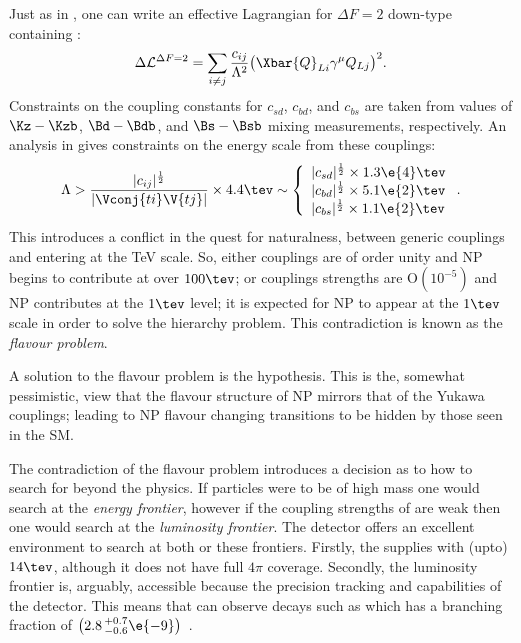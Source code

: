 Just as in , one can write an effective Lagrangian for $\Delta F=2$ down-type
\fcncs containing \np:
\begin{equation}
  \Delta\mathcal{L}^{\Delta F=2} =
  \sum_{i\neq j}\frac{c_{ij}}{\Lambda^2}
  \big(\Xbar{Q}_{Li}\gamma^\mu Q_{Lj}\big)^2.
\end{equation}
Constraints on the coupling constants for $c_{sd}$, $c_{bd}$, and $c_{bs}$ are taken from
values of $\Kz-\Kzb$, $\Bd-\Bdb$, and $\Bs-\Bsb$ mixing measurements, respectively.
An analysis in  gives constraints on the energy scale from these couplings:
\begin{equation}
  \Lambda > \frac{|c_{ij}|^\frac12}{|\Vconj{ti}\V{tj}|}\times4.4\tev
  \sim
  \left\{
    \begin{array}{l}
      |c_{sd}|^\frac12\times 1.3\e{4}\tev \\
      |c_{bd}|^\frac12\times 5.1\e{2}\tev \\
      |c_{bs}|^\frac12\times 1.1\e{2}\tev \\
    \end{array}\right..
\end{equation}
This introduces a conflict in the quest for naturalness, between generic couplings and \np entering
at the TeV scale.
So, either couplings are of order unity and NP begins to contribute at over $100\tev$; or couplings
strengths are $\mathrm{O}(10^{-5})$ and NP contributes at the $1\tev$ level;
it is expected for NP to appear at the $1\tev$ scale in order to solve the hierarchy problem.
This contradiction is known as the \emph{flavour problem}.

A solution to the flavour problem is the \MFV hypothesis.
This is the, somewhat pessimistic, view that the flavour structure of NP mirrors that of the Yukawa
couplings; leading to NP flavour changing transitions to be hidden by those seen in the SM.


The contradiction of the flavour problem introduces a decision as to how to search for beyond the
\sm physics.
If \np particles were to be of high mass one would search at the \emph{energy frontier},
however if the coupling strengths of \np are weak then one would search at the
\emph{luminosity frontier}.
The \lhcb detector offers an excellent environment to search at both or these frontiers.
Firstly, the \lhc supplies \lhcb with (upto) $14\tev$, although it does not have full $4\pi$
coverage.
Secondly, the luminosity frontier is, arguably, accessible because the precision tracking and \pid
capabilities of the \lhcb detector.
This means that \lhcb can observe decays such as \decay{\Bs}{\mumu} which has a branching fraction
of $\big(2.8\,^{+0.7}_{-0.6}\e{-9}\big)$~\cite{LHCb-PAPER-2014-049}.






